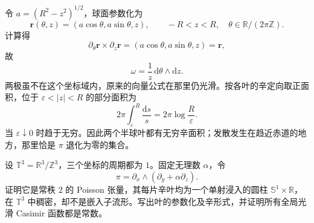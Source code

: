 \begin{solution}
	令 \(a=(R^2-z^2)^{1/2}\)，球面参数化为
	\[
		\mathbf r(\theta,z)=(a\cos\theta,a\sin\theta,z),
		\qquad -R<z<R,\quad \theta\in\mathbb R/(2\pi\mathbb Z).
	\]
	计算得
	\[
		\partial_\theta\mathbf r\times\partial_z\mathbf r
		=(a\cos\theta,a\sin\theta,z)=\mathbf r,
	\]
	故
	\[
		\omega=\frac1z\,\mathrm{d}\theta\wedge\mathrm{d}z.
	\]
	两极虽不在这个坐标域内，原来的向量公式在那里仍光滑。按各叶的辛定向取正面积，位于 \(\varepsilon<|z|<R\) 的部分面积为
	\[
		2\pi\int_\varepsilon^R\frac{\mathrm{d}s}{s}
		=2\pi\log\frac R\varepsilon.
	\]
	当 \(\varepsilon\downarrow0\) 时趋于无穷。因此两个半球叶都有无穷辛面积；发散发生在趋近赤道的地方，那里恰是 \(\pi\) 退化为零的集合。
\end{solution}

\begin{optionalexercise}\label{g4:ex:0904:dense-leaves}
	设 \(\mathbb T^3=\mathbb R^3/\mathbb Z^3\)，三个坐标的周期都为 \(1\)。固定无理数 \(\alpha\)，令
	\[
		\pi=\partial_x\wedge(\partial_y+\alpha\partial_z).
	\]
	证明它是常秩 \(2\) 的 Poisson 张量，其每片辛叶均为一个单射浸入的圆柱 \(\mathbb S^1\times\mathbb R\)，在 \(\mathbb T^3\) 中稠密，却不是嵌入子流形。写出叶的参数化及辛形式，并证明所有全局光滑 Casimir 函数都是常数。
\end{optionalexercise}
